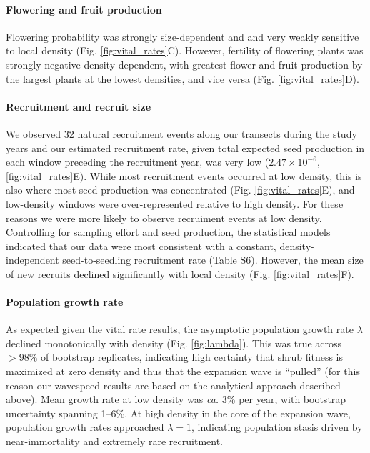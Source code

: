 \documentclass[11pt]{article}\usepackage[]{graphicx}\usepackage[usenames,dvipsnames]{xcolor}
\begin{document}
\paragraph{Flowering and fruit production}
Flowering probability was strongly size-dependent and and very weakly sensitive to local density (Fig. \ref{fig:vital_rates}C). 
However, fertility of flowering plants was strongly negative density dependent, with greatest flower and fruit production by the largest plants at the lowest densities, and vice versa (Fig. \ref{fig:vital_rates}D).

\paragraph{Recruitment and recruit size}
We observed 32 natural recruitment events along our transects during the study years and our estimated recruitment rate, given total expected seed production in each window preceding the recruitment year, was very low ($2.47 \times 10^{-6}$, \ref{fig:vital_rates}E). 
While most recruitment events occurred at low density, this is also where most seed production was concentrated (Fig. \ref{fig:vital_rates}E), and low-density windows were over-represented relative to high density. 
For these reasons we were more likely to observe recruiment events at low density. 
Controlling for sampling effort and seed production, the statistical models indicated that our data were most consistent with a constant, density-independent seed-to-seedling recruitment rate (Table S6). 
However, the mean size of new recruits declined significantly with local density (Fig. \ref{fig:vital_rates}F).


\paragraph{Population growth rate}
As expected given the vital rate results, the asymptotic population growth rate $\lambda$ declined monotonically with density (Fig. \ref{fig:lambda}). 
This was true across $>98\%$ of bootstrap replicates, indicating high certainty that shrub fitness is maximized at zero density and thus that the expansion wave is ``pulled'' (for this reason our wavespeed results are based on the analytical approach described above). 
Mean growth rate at low density was \textit{ca.} 3\% per year, with bootstrap uncertainty spanning 1--6\%.
At high density in the core of the expansion wave, population growth rates approached $\lambda=1$, indicating population stasis driven by near-immortality and extremely rare recruitment. 
\end{document}
